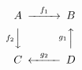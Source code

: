\documentclass{article}
\begin{document}
$$\begin{CD}
A @>f_1>> B\\
@Vf_2VV @Ag_1AA\\
C @<g_2<< D
\end{CD}$$
\end{document}
